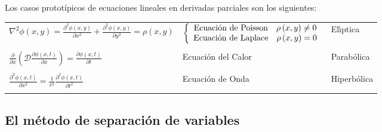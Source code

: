 \documentclass[spanish,titlepage,11pt]{article}
\begin{document}
Los casos protot\'{i}picos de ecuaciones lineales en derivadas parciales son
los si\-guien\-tes:\newline
\begin{tabular}
[c]{lll}%
$\nabla^{2}\phi\left(  x,y\right)  =\frac{\partial^{2}\phi\left(  x,y\right)
}{\partial x^{2}}+\frac{\partial^{2}\phi\left(  x,y\right)  }{\partial y^{2}%
}=\rho\left(  x,y\right)  $ & $\left\{
\begin{array}
[c]{c}%
\mathrm{Ecuaci\acute{o}n\ de\ Poisson\quad}\rho\left(  x,y\right)  \neq0\\
\mathrm{Ecuaci\acute{o}n\ de\ Laplace\quad}\rho\left(  x,y\right)  =0
\end{array}
\right.  $ & \textsf{El\'{\i}ptica}\\
&  & \\
$\frac{\partial}{\partial x}\left(  \mathcal{D}\frac{\partial\phi\left(
x,t\right)  }{\partial x}\right)  =\frac{\partial\phi\left(  x,t\right)
}{\partial t}$ & Ecuaci\'{o}n del Calor & \textsf{Parab\'{o}lica}\\
&  & \\
$\frac{\partial^{2}\phi\left(  x,t\right)  }{\partial x^{2}}=\frac{1}{v^{2}%
}\frac{\partial^{2}\phi\left(  x,t\right)  }{\partial t^{2}}$ & Ecuaci\'{o}n
de Onda & \textsf{Hiperb\'{o}lica}\\
&  &
\end{tabular}

\subsection{El m\'{e}todo de separaci\'{o}n de variables}
\end{document}
